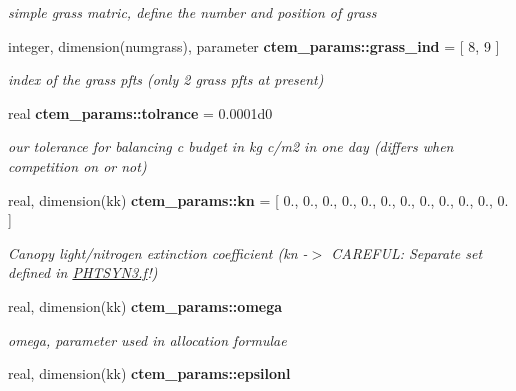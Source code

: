\begin{DoxyCompactItemize}
\begin{DoxyCompactList}\small\item\em simple grass matric, define the number and position of grass \end{DoxyCompactList}\item 
\hypertarget{namespacectem__params_ac0e6330dd6b8408f75fb25c1a7aa7fcb}{}integer, dimension(numgrass), parameter {\bfseries ctem\+\_\+params\+::grass\+\_\+ind} = \mbox{[} 8, 9 \mbox{]}\label{namespacectem__params_ac0e6330dd6b8408f75fb25c1a7aa7fcb}

\begin{DoxyCompactList}\small\item\em index of the grass pfts (only 2 grass pfts at present) \end{DoxyCompactList}\item 
\hypertarget{namespacectem__params_a0556fbcb62b10a6e390157c628d227d1}{}real {\bfseries ctem\+\_\+params\+::tolrance} = 0.\+0001d0\label{namespacectem__params_a0556fbcb62b10a6e390157c628d227d1}

\begin{DoxyCompactList}\small\item\em our tolerance for balancing c budget in kg c/m2 in one day (differs when competition on or not) \end{DoxyCompactList}\item 
\hypertarget{namespacectem__params_a3a1fb11af516cf3daa780402bdbde953}{}real, dimension(kk) {\bfseries ctem\+\_\+params\+::kn} = \mbox{[} 0., 0., 0., 0., 0., 0., 0., 0., 0., 0., 0., 0. \mbox{]}\label{namespacectem__params_a3a1fb11af516cf3daa780402bdbde953}

\begin{DoxyCompactList}\small\item\em Canopy light/nitrogen extinction coefficient (kn -\/$>$ C\+A\+R\+E\+F\+U\+L\+: Separate set defined in \hyperlink{PHTSYN3_8f}{P\+H\+T\+S\+Y\+N3.\+f}!) \end{DoxyCompactList}\item 
\hypertarget{namespacectem__params_a632738827e870757c4538eb8abd3ba18}{}real, dimension(kk) {\bfseries ctem\+\_\+params\+::omega}\label{namespacectem__params_a632738827e870757c4538eb8abd3ba18}

\begin{DoxyCompactList}\small\item\em omega, parameter used in allocation formulae \end{DoxyCompactList}\item 
\hypertarget{namespacectem__params_a555429920f02dff7239a96256af1a0eb}{}real, dimension(kk) {\bfseries ctem\+\_\+params\+::epsilonl}\label{namespacectem__params_a555429920f02dff7239a96256af1a0eb}


\end{DoxyCompactItemize}
